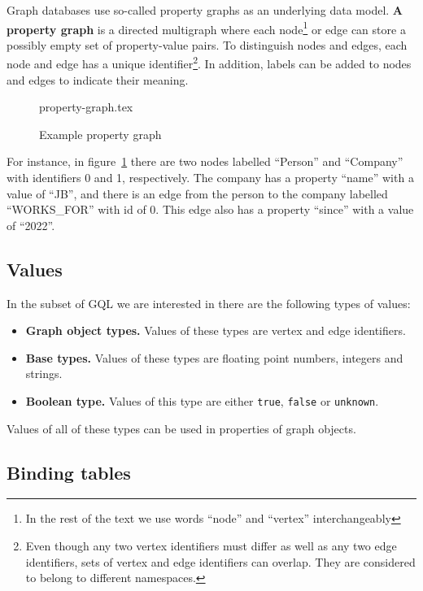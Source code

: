 \documentclass[14pt]{constructor-thesis}
\theoremstyle{definition}
\begin{document}
Graph databases use so-called property graphs as an underlying data model. \textbf{A property graph} is a directed multigraph where each node\footnote{In the rest of the text we use words ``node'' and ``vertex'' interchangeably} or edge can store a possibly empty set of property-value pairs. To distinguish nodes and edges, each node and edge has a unique identifier\footnote{Even though any two vertex identifiers must differ as well as any two edge identifiers, sets of vertex and edge identifiers can overlap. They are considered to belong to different namespaces.}. In addition, labels can be added to nodes and edges to indicate their meaning.

\begin{figure}[b]
  \centering
  
  {property-graph.tex}

  \caption{Example property graph}
  \label{fig:property-graph}
\end{figure}

For instance, in figure~\ref{fig:property-graph} there are two nodes labelled ``Person'' and ``Company'' with identifiers 0 and 1, respectively. The company has a property ``name'' with a value of ``JB'', and there is an edge from the person to the company labelled ``WORKS\_FOR'' with id of 0. This edge also has a property ``since'' with a value of ``2022''.

\subsection{Values}
\label{section:intro-values}

In the subset of GQL we are interested in there are the following types of values:
\begin{itemize}
  \item \textbf{Graph object types.} Values of these types are vertex and edge identifiers.
  \item \textbf{Base types.} Values of these types are floating point numbers, integers and strings. 
  \item \textbf{Boolean type.} Values of this type are either \texttt{true}, \texttt{false} or \texttt{unknown}.
\end{itemize}

Values of all of these types can be used in properties of graph objects.

\subsection{Binding tables}
\label{section:intro-binding-tables}
\end{document}

